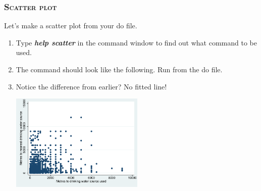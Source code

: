 \documentclass[10pt]{beamer}
\begin{document}
	\begin{frame}
	\frametitle{\textsc{Scatter plot}}	
		 Let's make a scatter plot from your do file.
		\begin{enumerate}
			 \item Type \textbf{\textit{help scatter}} in the command window to find out what command to be used.
			 \onslide<2-> \item The command should look like the following. Run from the do file.
		
\begin{stlog}\end{stlog}
			\vspace{1mm}
			 \item Notice the difference from earlier? No fitted line!
			\vspace{1mm}
		
\begin{center}
    \includegraphics[width=0.5\textwidth]{scatter_2.pdf}
\end{center}
		\end{enumerate}
	\end{frame}
	
\end{document}
